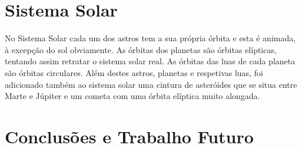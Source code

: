 \documentclass[a4paper]{article}
\begin{document}
\section{Sistema Solar}

No Sistema Solar cada um dos astros tem a sua própria órbita e esta é animada, à excepção do sol obviamente.
As órbitas dos planetas são órbitas elípticas, tentando assim retratar o sistema solar real. As órbitas das luas de cada planeta são órbitas circulares.
Além destes astros, planetas e respetivas luas, foi adicionado também ao sistema solar uma cintura de asteróides que se situa entre Marte e Júpiter e um cometa com uma órbita elíptica muito alongada.


\section{Conclusões e Trabalho Futuro}

\end{document}
